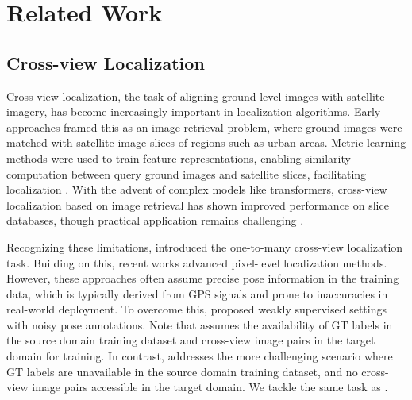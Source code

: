 \section{Related Work}
\subsection{Cross-view Localization}
Cross-view localization, the task of aligning ground-level images with satellite imagery, has become increasingly important in localization algorithms. Early approaches framed this as an image retrieval problem, where ground images were matched with satellite image slices of regions such as urban areas. Metric learning methods were used to train feature representations, enabling similarity computation between query ground images and satellite slices, facilitating localization \cite{lin2013cross, regmi2018cross, shi2019spatial, Liu_2019_CVPR, shi2020optimal}. With the advent of complex models like transformers, cross-view localization based on image retrieval has shown improved performance on slice databases, though practical application remains challenging \cite{yang2021cross, Zhu_2022_CVPR}.

Recognizing these limitations, \cite{zhu2021vigor} introduced the one-to-many cross-view localization task. Building on this, recent works \cite{shi2022beyond, xia2022visual, fervers2022uncertainty, lentsch2023slicematch, sarlin2023orienternet, wang2024view} advanced pixel-level localization methods. However, these approaches often assume precise pose information in the training data, which is typically derived from GPS signals and prone to inaccuracies in real-world deployment. To overcome this, \cite{shi2024weakly, xia2024adapting} proposed weakly supervised settings with noisy pose annotations. 
Note that \cite{xia2024adapting} assumes the availability of GT labels in the source domain training dataset and cross-view image pairs in the target domain for training. In contrast, \cite{shi2024weakly} addresses the more challenging scenario where GT labels are unavailable in the source domain training dataset, and no cross-view image pairs accessible in the target domain. We tackle the same task as \cite{shi2024weakly}.

